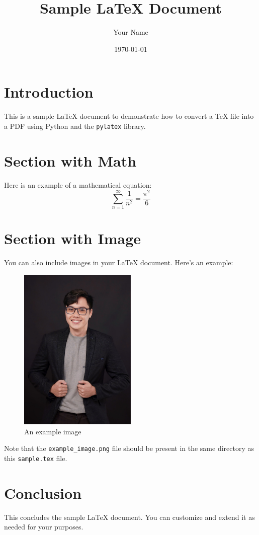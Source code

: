 \documentclass{article}
\title{Sample LaTeX Document}
\author{Your Name}
\date{\today}
\begin{document}
\maketitle

\section{Introduction}
This is a sample LaTeX document to demonstrate how to convert a TeX file into a PDF using Python and the \texttt{pylatex} library.

\section{Section with Math}
Here is an example of a mathematical equation:
\begin{equation}
    \sum_{n=1}^{\infty} \frac{1}{n^2} = \frac{\pi^2}{6}
\end{equation}

\section{Section with Image}
You can also include images in your LaTeX document. Here's an example:

\begin{figure}[ht]
    \centering
    \includegraphics[width=0.5\textwidth]{example_image.png}
    \caption{An example image}
    \label{fig:example-image}
\end{figure}

Note that the \texttt{example\_image.png} file should be present in the same directory as this \texttt{sample.tex} file.

\section{Conclusion}
This concludes the sample LaTeX document. You can customize and extend it as needed for your purposes.
\end{document}

